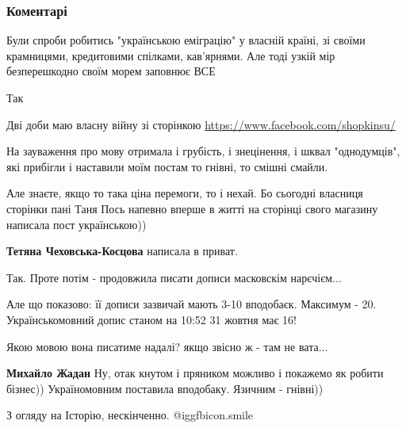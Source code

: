  
 
 
 
 
\subsubsection{Коментарі}

\begin{itemize} %

Були спроби робитись "українською еміграцію" у власній країні, зі своїми
крамницями, кредитовими спілками, кав'ярнями. Але тоді узкій мір безперешкодно
своїм морем заповнює ВСЕ

Так


Дві доби маю власну війну зі сторінкою \url{https://www.facebook.com/shopkinsu/}

На зауваження про мову отримала і грубість, і знецінення, і шквал "однодумців",
які прибігли і наставили моїм постам то гнівні, то смішні смайли.

Але знаєте, якщо то така ціна перемоги, то і нехай. Бо сьогодні власниця
сторінки пані Таня Пось напевно вперше в житті на сторінці свого магазину
написала пост українською))

\begin{itemize} %
\textbf{Тетяна Чеховська-Косцова} написала в приват.


Так. Проте потім - продовжила писати дописи масковскім нарєчієм...

Але що показово: її дописи зазвичай мають 3-10 вподобаєк. Максимум - 20.
Українськомовний допис станом на 10:52 31 жовтня має 16!

Якою мовою вона писатиме надалі? якщо звісно ж - там не вата...

\textbf{Михайло Жадан}
Ну, отак кнутом і пряником можливо і покажемо як робити бізнес))
Україномовним поставила вподобаку. Язичним - гнівні))
\end{itemize} %

З огляду на Історію, нескінченно.  @igg{fbicon.smile} 


\end{itemize}
